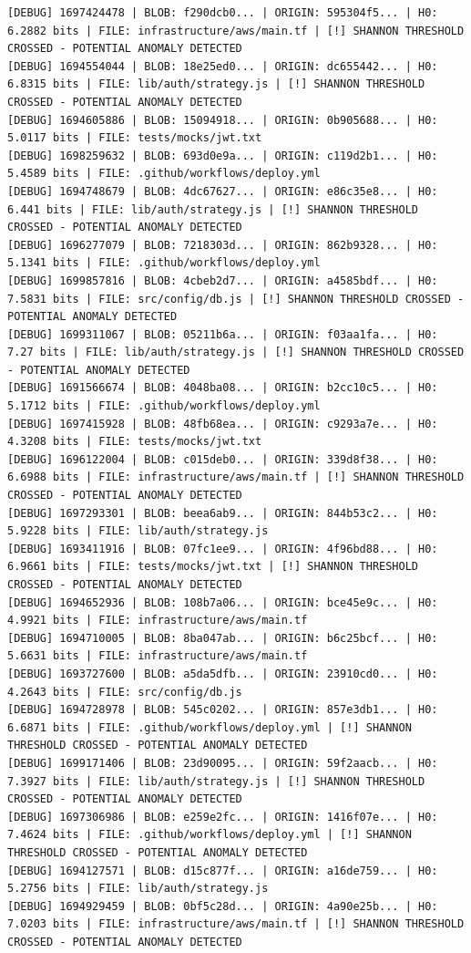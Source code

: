 \documentclass[12pt, a4paper, oneside]{report}
\begin{document}
\begin{lstlisting}[basicstyle=\tiny\ttfamily]
[DEBUG] 1697424478 | BLOB: f290dcb0... | ORIGIN: 595304f5... | H0: 6.2882 bits | FILE: infrastructure/aws/main.tf | [!] SHANNON THRESHOLD CROSSED - POTENTIAL ANOMALY DETECTED
[DEBUG] 1694554044 | BLOB: 18e25ed0... | ORIGIN: dc655442... | H0: 6.8315 bits | FILE: lib/auth/strategy.js | [!] SHANNON THRESHOLD CROSSED - POTENTIAL ANOMALY DETECTED
[DEBUG] 1694605886 | BLOB: 15094918... | ORIGIN: 0b905688... | H0: 5.0117 bits | FILE: tests/mocks/jwt.txt
[DEBUG] 1698259632 | BLOB: 693d0e9a... | ORIGIN: c119d2b1... | H0: 5.4589 bits | FILE: .github/workflows/deploy.yml
[DEBUG] 1694748679 | BLOB: 4dc67627... | ORIGIN: e86c35e8... | H0: 6.441 bits | FILE: lib/auth/strategy.js | [!] SHANNON THRESHOLD CROSSED - POTENTIAL ANOMALY DETECTED
[DEBUG] 1696277079 | BLOB: 7218303d... | ORIGIN: 862b9328... | H0: 5.1341 bits | FILE: .github/workflows/deploy.yml
[DEBUG] 1699857816 | BLOB: 4cbeb2d7... | ORIGIN: a4585bdf... | H0: 7.5831 bits | FILE: src/config/db.js | [!] SHANNON THRESHOLD CROSSED - POTENTIAL ANOMALY DETECTED
[DEBUG] 1699311067 | BLOB: 05211b6a... | ORIGIN: f03aa1fa... | H0: 7.27 bits | FILE: lib/auth/strategy.js | [!] SHANNON THRESHOLD CROSSED - POTENTIAL ANOMALY DETECTED
[DEBUG] 1691566674 | BLOB: 4048ba08... | ORIGIN: b2cc10c5... | H0: 5.1712 bits | FILE: .github/workflows/deploy.yml
[DEBUG] 1697415928 | BLOB: 48fb68ea... | ORIGIN: c9293a7e... | H0: 4.3208 bits | FILE: tests/mocks/jwt.txt
[DEBUG] 1696122004 | BLOB: c015deb0... | ORIGIN: 339d8f38... | H0: 6.6988 bits | FILE: infrastructure/aws/main.tf | [!] SHANNON THRESHOLD CROSSED - POTENTIAL ANOMALY DETECTED
[DEBUG] 1697293301 | BLOB: beea6ab9... | ORIGIN: 844b53c2... | H0: 5.9228 bits | FILE: lib/auth/strategy.js
[DEBUG] 1693411916 | BLOB: 07fc1ee9... | ORIGIN: 4f96bd88... | H0: 6.9661 bits | FILE: tests/mocks/jwt.txt | [!] SHANNON THRESHOLD CROSSED - POTENTIAL ANOMALY DETECTED
[DEBUG] 1694652936 | BLOB: 108b7a06... | ORIGIN: bce45e9c... | H0: 4.9921 bits | FILE: infrastructure/aws/main.tf
[DEBUG] 1694710005 | BLOB: 8ba047ab... | ORIGIN: b6c25bcf... | H0: 5.6631 bits | FILE: infrastructure/aws/main.tf
[DEBUG] 1693727600 | BLOB: a5da5dfb... | ORIGIN: 23910cd0... | H0: 4.2643 bits | FILE: src/config/db.js
[DEBUG] 1694728978 | BLOB: 545c0202... | ORIGIN: 857e3db1... | H0: 6.6871 bits | FILE: .github/workflows/deploy.yml | [!] SHANNON THRESHOLD CROSSED - POTENTIAL ANOMALY DETECTED
[DEBUG] 1699171406 | BLOB: 23d90095... | ORIGIN: 59f2aacb... | H0: 7.3927 bits | FILE: lib/auth/strategy.js | [!] SHANNON THRESHOLD CROSSED - POTENTIAL ANOMALY DETECTED
[DEBUG] 1697306986 | BLOB: e259e2fc... | ORIGIN: 1416f07e... | H0: 7.4624 bits | FILE: .github/workflows/deploy.yml | [!] SHANNON THRESHOLD CROSSED - POTENTIAL ANOMALY DETECTED
[DEBUG] 1694127571 | BLOB: d15c877f... | ORIGIN: a16de759... | H0: 5.2756 bits | FILE: lib/auth/strategy.js
[DEBUG] 1694929459 | BLOB: 0bf5c28d... | ORIGIN: 4a90e25b... | H0: 7.0203 bits | FILE: infrastructure/aws/main.tf | [!] SHANNON THRESHOLD CROSSED - POTENTIAL ANOMALY DETECTED
\end{lstlisting}
\end{document}
